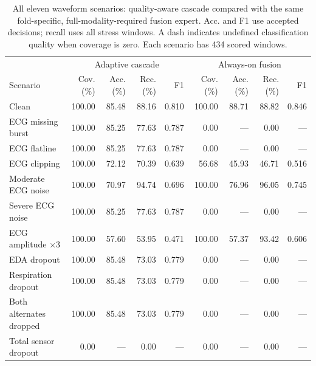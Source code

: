\begin{table}[t]
\centering\caption{All eleven waveform scenarios: quality-aware cascade compared with the same fold-specific, full-modality-required fusion expert. Acc. and F1 use accepted decisions; recall uses all stress windows. A dash indicates undefined classification quality when coverage is zero. Each scenario has 434 scored windows.}
\label{tab:failures}\small
\begin{tabular}{lrrrrrrrr}\toprule
 & \multicolumn{4}{c}{Adaptive cascade} & \multicolumn{4}{c}{Always-on fusion}\\
Scenario & Cov. (\%) & Acc. (\%) & Rec. (\%) & F1 & Cov. (\%) & Acc. (\%) & Rec. (\%) & F1\\\midrule
Clean & 100.00 & 85.48 & 88.16 & 0.810 & 100.00 & 88.71 & 88.82 & 0.846\\
ECG missing burst & 100.00 & 85.25 & 77.63 & 0.787 & 0.00 & --- & 0.00 & ---\\
ECG flatline & 100.00 & 85.25 & 77.63 & 0.787 & 0.00 & --- & 0.00 & ---\\
ECG clipping & 100.00 & 72.12 & 70.39 & 0.639 & 56.68 & 45.93 & 46.71 & 0.516\\
Moderate ECG noise & 100.00 & 70.97 & 94.74 & 0.696 & 100.00 & 76.96 & 96.05 & 0.745\\
Severe ECG noise & 100.00 & 85.25 & 77.63 & 0.787 & 0.00 & --- & 0.00 & ---\\
ECG amplitude $\times3$ & 100.00 & 57.60 & 53.95 & 0.471 & 100.00 & 57.37 & 93.42 & 0.606\\
EDA dropout & 100.00 & 85.48 & 73.03 & 0.779 & 0.00 & --- & 0.00 & ---\\
Respiration dropout & 100.00 & 85.48 & 73.03 & 0.779 & 0.00 & --- & 0.00 & ---\\
Both alternates dropped & 100.00 & 85.48 & 73.03 & 0.779 & 0.00 & --- & 0.00 & ---\\
Total sensor dropout & 0.00 & --- & 0.00 & --- & 0.00 & --- & 0.00 & ---\\
\bottomrule\end{tabular}
\end{table}
